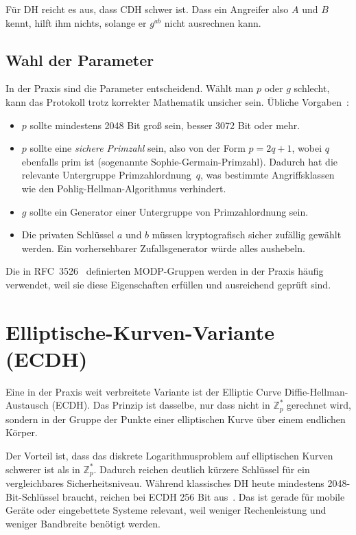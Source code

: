\documentclass[conference]{IEEEtran}
\begin{document}
Für DH reicht es aus, dass CDH schwer ist. Dass ein Angreifer also
$A$ und $B$ kennt, hilft ihm nichts, solange er $g^{ab}$ nicht
ausrechnen kann.

\subsection{Wahl der Parameter}

In der Praxis sind die Parameter entscheidend. Wählt man $p$ oder $g$
schlecht, kann das Protokoll trotz korrekter Mathematik unsicher sein.
Übliche Vorgaben~\cite{bsi-tr}:

\begin{itemize}
    \item $p$ sollte mindestens 2048 Bit groß sein, besser 3072 Bit
        oder mehr.

    \item $p$ sollte eine \emph{sichere Primzahl} sein, also von der
        Form $p = 2q + 1$, wobei $q$ ebenfalls prim ist (sogenannte
        Sophie-Germain-Primzahl). Dadurch hat die relevante
        Untergruppe Primzahlordnung~$q$, was bestimmte
        Angriffsklassen wie den Pohlig-Hellman-Algorithmus
        verhindert.

    \item $g$ sollte ein Generator einer Untergruppe von Primzahlordnung
        sein.

    \item Die privaten Schlüssel $a$ und $b$ müssen kryptografisch
        sicher zufällig gewählt werden. Ein vorhersehbarer
        Zufallsgenerator würde alles aushebeln.
\end{itemize}

Die in RFC~3526~\cite{rfc3526} definierten MODP-Gruppen werden in der
Praxis häufig verwendet, weil sie diese Eigenschaften erfüllen und
ausreichend geprüft sind.

\section{Elliptische-Kurven-Variante (ECDH)}

Eine in der Praxis weit verbreitete Variante ist der Elliptic Curve
Diffie-Hellman-Austausch (ECDH). Das Prinzip ist dasselbe, nur dass
nicht in $\mathbb{Z}_p^*$ gerechnet wird, sondern in der Gruppe der
Punkte einer elliptischen Kurve über einem endlichen Körper.

Der Vorteil ist, dass das diskrete Logarithmusproblem auf elliptischen
Kurven schwerer ist als in $\mathbb{Z}_p^*$. Dadurch reichen deutlich
kürzere Schlüssel für ein vergleichbares Sicherheitsniveau. Während
klassisches DH heute mindestens 2048-Bit-Schlüssel braucht, reichen
bei ECDH 256 Bit aus~\cite{rfc8446}. Das ist gerade für mobile Geräte
oder eingebettete Systeme relevant, weil weniger Rechenleistung und
weniger Bandbreite benötigt werden.
\end{document}
